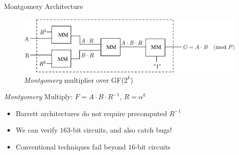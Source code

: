 \documentclass[xcolor=dvipsnames]{beamer}
\begin{document}









\begin{frame}{\large {Montgomery Architecture}}
\begin{figure}[hbt]
\centerline{
\includegraphics[scale=0.75]{mmcircuit.eps}
}
\caption{{\it Montgomery} multiplier over GF($2^k$)}
\label{fig:mm4}
\end{figure}

{{\it  Montgomery} Multiply: $F = A\cdot B \cdot R^{-1}$, $R = \alpha^k$}


\begin{itemize}
\item Barrett architectures do not require precomputed $R^{-1}$
\item We can verify $163$-bit circuits, and also catch bugs!
\item Conventional techniques fail beyond $16$-bit circuits
\end{itemize}


\end{frame}
\end{document}
